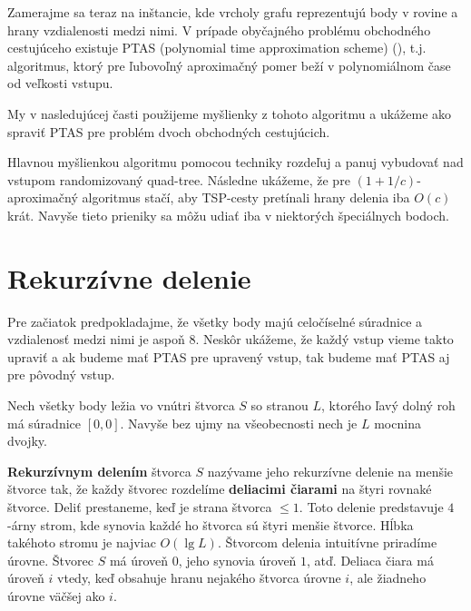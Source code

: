 Zamerajme sa teraz na inštancie, kde vrcholy grafu reprezentujú body v rovine a hrany
vzdialenosti medzi nimi. V prípade obyčajného problému obchodného cestujúceho
existuje PTAS (polynomial time approximation scheme) (\cite{Arora}), t.j. algoritmus, ktorý
pre ľubovoľný aproximačný pomer beží v polynomiálnom čase od veľkosti vstupu.

My v nasledujúcej časti použijeme myšlienky z tohoto algoritmu a ukážeme ako spraviť PTAS pre
problém dvoch obchodných cestujúcich.

Hlavnou myšlienkou algoritmu pomocou techniky rozdeľuj a panuj vybudovať nad vstupom
randomizovaný quad-tree. Následne ukážeme, že pre $(1 + 1/c)$-aproximačný algoritmus stačí, aby
TSP-cesty pretínali hrany delenia iba $O(c)$ krát. Navyše tieto prieniky sa môžu
udiať iba v niektorých špeciálnych bodoch.

\section{Rekurzívne delenie}

%

Pre začiatok predpokladajme, že všetky body majú celočíselné súradnice a vzdialenosť
medzi nimi je aspoň $8$. Neskôr ukážeme, že každý vstup vieme takto upraviť a ak budeme mať PTAS
pre upravený vstup, tak budeme mať PTAS aj pre pôvodný vstup.

Nech všetky body ležia vo vnútri štvorca $S$ so stranou $L$, ktorého ľavý dolný roh
má súradnice $[0,0]$. Navyše bez ujmy na všeobecnosti nech je $L$ mocnina dvojky.

{\bf Rekurzívnym delením} štvorca $S$ nazývame jeho rekurzívne delenie na menšie štvorce tak, že
každy štvorec rozdelíme {\bf deliacimi čiarami} na štyri rovnaké štvorce.
Deliť prestaneme, keď je strana štvorca $\leq 1$. Toto delenie predstavuje
$4$-árny strom, kde synovia každé ho štvorca sú štyri menšie štvorce. Hĺbka takéhoto stromu je
najviac $O(\lg L)$. 
Štvorcom delenia intuitívne priradíme úrovne. Štvorec $S$ má úroveň $0$, jeho synovia úroveň $1$,
atď. Deliaca čiara má úroveň $i$ vtedy, keď obsahuje hranu nejakého štvorca úrovne $i$, ale žiadneho
úrovne väčšej ako $i$.

